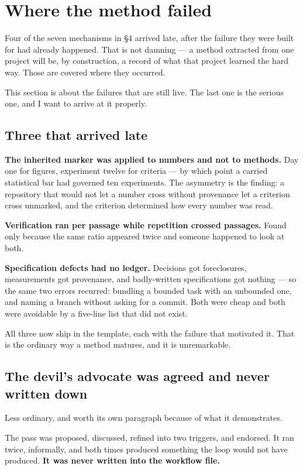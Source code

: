 \section{Where the method failed}

Four of the seven mechanisms in \S4 arrived late, after the failure they were built for had already happened. That is not damning --- a method extracted from one project will be, by construction, a record of what that project learned the hard way. Those are covered where they occurred.

This section is about the failures that are still live. The last one is the serious one, and I want to arrive at it properly.

\subsection{Three that arrived late}

\textbf{The inherited marker was applied to numbers and not to methods.} Day one for figures, experiment twelve for criteria --- by which point a carried statistical bar had governed ten experiments. The asymmetry is the finding: a repository that would not let a number cross without provenance let a criterion cross unmarked, and the criterion determined how every number was read.

\textbf{Verification ran per passage while repetition crossed passages.} Found only because the same ratio appeared twice and someone happened to look at both.

\textbf{Specification defects had no ledger.} Decisions got foreclosures, measurements got provenance, and badly-written specifications got nothing --- so the same two errors recurred: bundling a bounded task with an unbounded one, and naming a branch without asking for a commit. Both were cheap and both were avoidable by a five-line list that did not exist.

All three now ship in the template, each with the failure that motivated it. That is the ordinary way a method matures, and it is unremarkable.

\subsection{The devil's advocate was agreed and never written down}

Less ordinary, and worth its own paragraph because of what it demonstrates.

The pass was proposed, discussed, refined into two triggers, and endorsed. It ran twice, informally, and both times produced something the loop would not have produced. \textbf{It was never written into the workflow file.}

